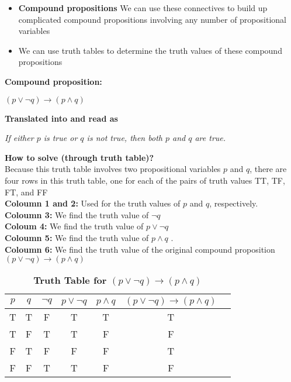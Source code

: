 \begin{itemize}
    \item \textbf{Compound propositions} We can use these connectives to build up complicated compound propositions involving any number of propositional
variables
    \item We can use truth tables to determine the truth values of these compound propositions
\end{itemize}
\begin{tcolorbox}[title=Example of compound propositions]
\textbf{Compound proposition:}  
\begin{center}
$(p \lor \neg q ) \rightarrow (p \land q)$
\end{center}
\textbf{Translated into and read as}
\begin{center}
\textit{If either $p$ is true or $q$ is not true, then both $p$ and $q$ are true.}
\end{center}
\textbf{How to solve (through truth table)?} \\
Because this truth table involves two propositional variables $p$ and $q$, there are four
rows in this truth table, one for each of the pairs of truth values TT, TF, FT, and FF \\
\textbf{Coloumn 1 and 2:} Used for the truth values of $p$ and $q$, respectively. \\
\textbf{Coloumn 3:} We find the truth value of $\neg q$ \\
\textbf{Coloum 4:} We find the truth value of $p \lor \neg q$ \\
\textbf{Coloumn 5:} We find the truth value of $p \land q$ . \\
\textbf{Coloumn 6:} We find the truth value of the original compound proposition $(p \lor \neg q ) \rightarrow (p \land q)$
\end{tcolorbox}
\begin{table}[h!]
\centering
\caption*{\textbf{Truth Table for $(p \lor \neg q) \rightarrow (p \land q)$}}
\begin{tabular}{|c|c!{\vrule width 1pt}c|c|c|c!{\vrule width 1.5pt}c|}
\hline
{}
$p$ & $q$ & $\neg q$ & $p \lor \neg q$ & $p \land q$ & $(p \lor \neg q) \rightarrow (p \land q)$ \\
\hline
T & T & F & T & T & T \\
T & F & T & T & F & F \\
F & T & F & F & F & T \\
F & F & T & T & F & F \\
\hline
\end{tabular}
\end{table}
